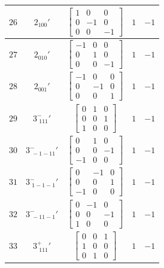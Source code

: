 \documentclass[fleqn,8pt]{jsarticle}
\begin{document}
\begin{longtable}{ccccc}
$ 26 $ & $ 2{}_{100}{}' $ & $ \begin{bmatrix} 1 & 0 & 0 \\ 0 & -1 & 0 \\ 0 & 0 & -1 \end{bmatrix} $ & $ 1 $ & $ -1 $ \\ \hline
$ 27 $ & $ 2{}_{010}{}' $ & $ \begin{bmatrix} -1 & 0 & 0 \\ 0 & 1 & 0 \\ 0 & 0 & -1 \end{bmatrix} $ & $ 1 $ & $ -1 $ \\ \hline
$ 28 $ & $ 2{}_{001}{}' $ & $ \begin{bmatrix} -1 & 0 & 0 \\ 0 & -1 & 0 \\ 0 & 0 & 1 \end{bmatrix} $ & $ 1 $ & $ -1 $ \\ \hline
$ 29 $ & $ 3^{-}_{\,\,111}{}' $ & $ \begin{bmatrix} 0 & 1 & 0 \\ 0 & 0 & 1 \\ 1 & 0 & 0 \end{bmatrix} $ & $ 1 $ & $ -1 $ \\ \hline
$ 30 $ & $ 3^{-}_{\,\,-1-11}{}' $ & $ \begin{bmatrix} 0 & 1 & 0 \\ 0 & 0 & -1 \\ -1 & 0 & 0 \end{bmatrix} $ & $ 1 $ & $ -1 $ \\ \hline
$ 31 $ & $ 3^{-}_{\,\,1-1-1}{}' $ & $ \begin{bmatrix} 0 & -1 & 0 \\ 0 & 0 & 1 \\ -1 & 0 & 0 \end{bmatrix} $ & $ 1 $ & $ -1 $ \\ \hline
$ 32 $ & $ 3^{-}_{\,\,-11-1}{}' $ & $ \begin{bmatrix} 0 & -1 & 0 \\ 0 & 0 & -1 \\ 1 & 0 & 0 \end{bmatrix} $ & $ 1 $ & $ -1 $ \\ \hline
$ 33 $ & $ 3^{+}_{\,\,111}{}' $ & $ \begin{bmatrix} 0 & 0 & 1 \\ 1 & 0 & 0 \\ 0 & 1 & 0 \end{bmatrix} $ & $ 1 $ & $ -1 $ \\ \hline

\end{longtable}
\end{document}
